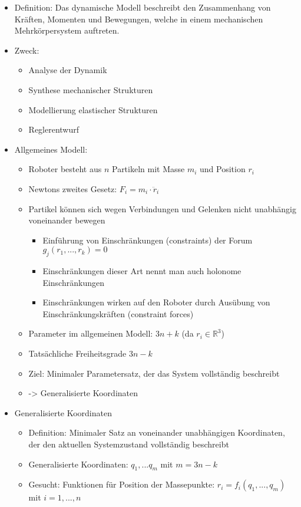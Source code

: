 \documentclass[paper=a4, fontsize=11pt]{scrartcl} %
\numberwithin{equation}{section} %
\numberwithin{figure}{section} %
\numberwithin{table}{section} %
\begin{document}
\begin{itemize}
\item Definition: Das dynamische Modell beschreibt den Zusammenhang von Kräften, Momenten und Bewegungen, welche in einem mechanischen Mehrkörpersystem auftreten.
\item Zweck:
\begin{itemize}
\item Analyse der Dynamik
\item Synthese mechanischer Strukturen
\item Modellierung elastischer Strukturen
\item Reglerentwurf
\end{itemize}
\item Allgemeines Modell:
\begin{itemize}
\item Roboter besteht aus $n$ Partikeln mit Masse $m_i$ und Position $r_i$
\item Newtons zweites Gesetz: $F_i = m_i \cdot \ddot r_i$
\item Partikel können sich wegen Verbindungen und Gelenken nicht unabhängig voneinander bewegen
\begin{itemize}
\item Einführung von Einschränkungen (constraints) der Forum $g_j(r_1,...,r_k) = 0$
\item Einschränkungen dieser Art nennt man auch holonome Einschränkungen
\item Einschränkungen wirken auf den Roboter durch Ausübung von Einschränkungskräften (constraint forces)
\end{itemize}
\item Parameter im allgemeinen Modell: $3n + k$ (da $r_i \in \mathbb{R}^3$)
\item Tatsächliche Freiheitsgrade $3n-k$
\item Ziel: Minimaler Parametersatz, der das System vollständig beschreibt
\item -> Generalisierte Koordinaten
\end{itemize}
\item Generalisierte Koordinaten
\begin{itemize}
\item Definition: Minimaler Satz an voneinander unabhängigen Koordinaten, der den aktuellen Systemzustand vollständig beschreibt
\item Generalisierte Koordinaten: $q_1,...q_m$ mit $m = 3n - k$
\item Gesucht: Funktionen für Position der Massepunkte: $r_i = f_i(q_1,...,q_m)$ mit $ i = 1,...,n$

\end{itemize}
\end{itemize}
\end{document}
